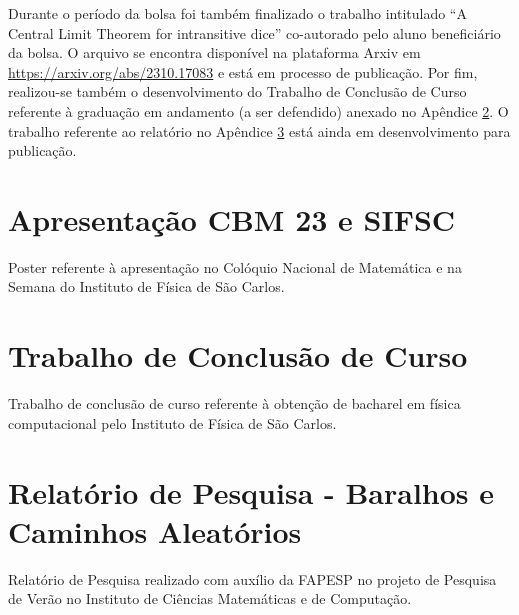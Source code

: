 \documentclass[12pt]{report}
\begin{document}
Durante o período da bolsa foi também finalizado o trabalho intitulado ``A Central Limit Theorem for intransitive dice'' co-autorado pelo aluno beneficiário da bolsa. O arquivo se encontra disponível na plataforma Arxiv em \url{https://arxiv.org/abs/2310.17083} e está em processo de publicação. Por fim, realizou-se também o desenvolvimento do Trabalho de Conclusão de Curso referente à graduação em andamento (a ser defendido) anexado no Apêndice \ref{App: TCC}. O trabalho referente ao relatório no Apêndice \ref{App: Baralhos} está ainda em desenvolvimento para publicação.







\appendix

\chapter{Apresentação CBM 23 e SIFSC}
\label{App: CMB}
Poster referente à apresentação no Colóquio Nacional de Matemática e na Semana do Instituto de Física de São Carlos.



\chapter{Trabalho de Conclusão de Curso}
\label{App: TCC}
Trabalho de conclusão de curso referente à obtenção de bacharel em física computacional pelo Instituto de Física de São Carlos.



\chapter{Relatório de Pesquisa - Baralhos e Caminhos Aleatórios}
\label{App: Baralhos}
Relatório de Pesquisa realizado com auxílio da FAPESP no projeto de Pesquisa de Verão no Instituto de Ciências Matemáticas e de Computação.


\end{document}
